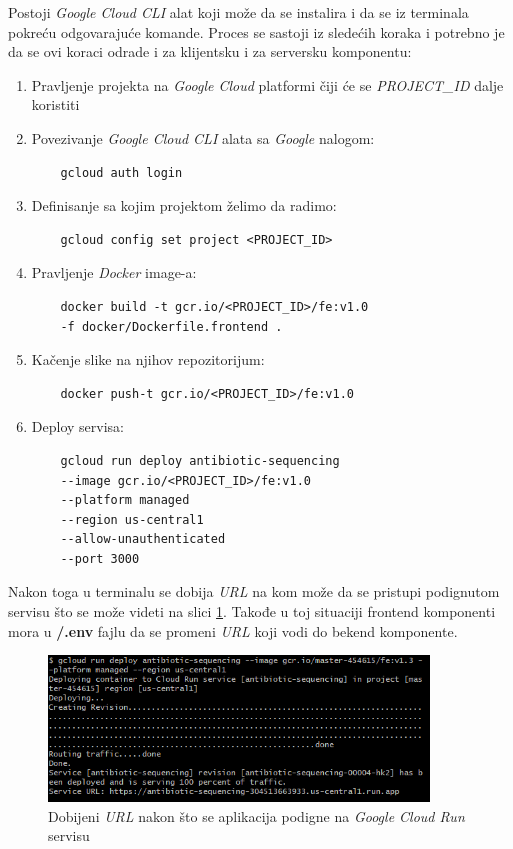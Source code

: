 \documentclass[12pt,oneside]{memoir}
\begin{document}
Postoji \emph{Google Cloud CLI} alat koji može da se instalira i da se iz terminala pokreću odgovarajuće komande. Proces se sastoji iz sledećih koraka i potrebno je da se ovi koraci odrade i za klijentsku i za serversku komponentu:

\begin{enumerate}
\item Pravljenje projekta na \emph{Google Cloud} platformi čiji će se \emph{PROJECT\_ID} dalje koristiti
\item Povezivanje \emph{Google Cloud CLI} alata sa \emph{Google} nalogom:
\begin{verbatim}
    gcloud auth login
\end{verbatim}
\item Definisanje sa kojim projektom želimo da radimo:
\begin{verbatim}
    gcloud config set project <PROJECT_ID>
\end{verbatim}
\item Pravljenje \emph{Docker} image-a:
\begin{verbatim}
    docker build -t gcr.io/<PROJECT_ID>/fe:v1.0 
    -f docker/Dockerfile.frontend .
\end{verbatim}
\item Kačenje slike na njihov repozitorijum:
\begin{verbatim}
    docker push-t gcr.io/<PROJECT_ID>/fe:v1.0
\end{verbatim}
\item Deploy servisa: 
\begin{verbatim}
    gcloud run deploy antibiotic-sequencing 
    --image gcr.io/<PROJECT_ID>/fe:v1.0 
    --platform managed 
    --region us-central1
    --allow-unauthenticated 
    --port 3000
\end{verbatim}
\end{enumerate}

Nakon toga u terminalu se dobija \emph{URL} na kom može da se pristupi podignutom servisu što se može videti na slici \ref{fig:gcr_deploy}. Takođe u toj situaciji frontend komponenti mora u \textbf{/.env} fajlu da se promeni \emph{URL} koji vodi do bekend komponente.

\begin{figure}[h]
\centering
\includegraphics[width=0.9\textwidth]{images/gcr_deploy.png}
\caption{Dobijeni \emph{URL} nakon što se aplikacija podigne na \emph{Google Cloud Run} servisu}
\label{fig:gcr_deploy}
\end{figure}
\end{document}
